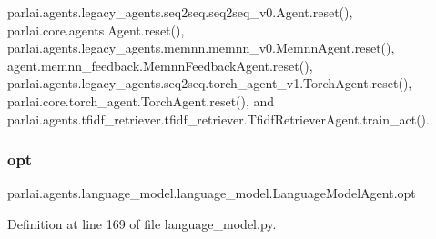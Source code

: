 parlai.\+agents.\+legacy\+\_\+agents.\+seq2seq.\+seq2seq\+\_\+v0.\+Agent.\+reset(), parlai.\+core.\+agents.\+Agent.\+reset(), parlai.\+agents.\+legacy\+\_\+agents.\+memnn.\+memnn\+\_\+v0.\+Memnn\+Agent.\+reset(), agent.\+memnn\+\_\+feedback.\+Memnn\+Feedback\+Agent.\+reset(), parlai.\+agents.\+legacy\+\_\+agents.\+seq2seq.\+torch\+\_\+agent\+\_\+v1.\+Torch\+Agent.\+reset(), parlai.\+core.\+torch\+\_\+agent.\+Torch\+Agent.\+reset(), and parlai.\+agents.\+tfidf\+\_\+retriever.\+tfidf\+\_\+retriever.\+Tfidf\+Retriever\+Agent.\+train\+\_\+act().

\mbox{\label{classparlai_1_1agents_1_1language__model_1_1language__model_1_1LanguageModelAgent_af8d8114af65bf817afe01545033d51e6}} 
\subsubsection{\texorpdfstring{opt}{opt}}
{\footnotesize\ttfamily parlai.\+agents.\+language\+\_\+model.\+language\+\_\+model.\+Language\+Model\+Agent.\+opt}



Definition at line 169 of file language\+\_\+model.\+py.




